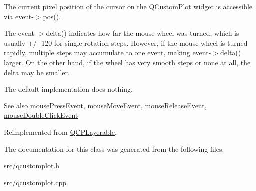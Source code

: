 The current pixel position of the cursor on the \hyperlink{classQCustomPlot}{Q\+Custom\+Plot} widget is accessible via {\ttfamily event-\/$>$pos()}.

The {\ttfamily event-\/$>$delta()} indicates how far the mouse wheel was turned, which is usually +/-\/ 120 for single rotation steps. However, if the mouse wheel is turned rapidly, multiple steps may accumulate to one event, making {\ttfamily event-\/$>$delta()} larger. On the other hand, if the wheel has very smooth steps or none at all, the delta may be smaller.

The default implementation does nothing.

\begin{DoxySeeAlso}{See also}
\hyperlink{classQCPColorScale_a91f633b97ffcd57fdf8cd814974c20e6}{mouse\+Press\+Event}, \hyperlink{classQCPColorScale_a3b2bd79725aefaf2630fc76e90939442}{mouse\+Move\+Event}, \hyperlink{classQCPColorScale_a6a35dd39ab4e5cb2d7b29ebb4d5b61b0}{mouse\+Release\+Event}, \hyperlink{classQCPLayerable_a4171e2e823aca242dd0279f00ed2de81}{mouse\+Double\+Click\+Event} 
\end{DoxySeeAlso}


Reimplemented from \hyperlink{classQCPLayerable_a47dfd7b8fd99c08ca54e09c362b6f022}{Q\+C\+P\+Layerable}.



The documentation for this class was generated from the following files\+:\begin{DoxyCompactItemize}
\item 
src/qcustomplot.\+h\item 
src/qcustomplot.\+cpp\end{DoxyCompactItemize}
